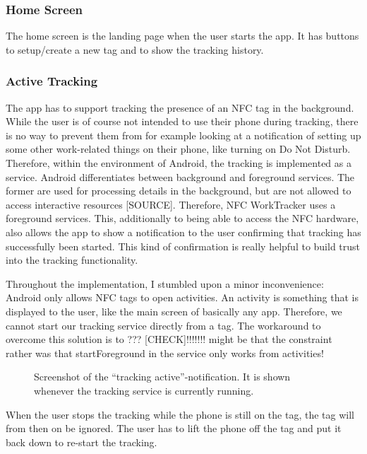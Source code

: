 \documentclass[conference]{IEEEtran}
\newcommand{\projectname}{NFC WorkTracker}
\begin{document}
\subsubsection{Home Screen}
The home screen is the landing page when the user starts the app. It has buttons to setup/create a new tag and to show the tracking history.

\subsubsection{Active Tracking}
The app has to support tracking the presence of an NFC tag in the background. While the user is of course not intended to use their phone during tracking, there is no way to prevent them from for example looking at a notification of setting up some other work-related things on their phone, like turning on Do Not Disturb. Therefore, within the environment of Android, the tracking is implemented as a service. Android differentiates between background and foreground services. The former are used for processing details in the background, but are not allowed to access interactive resources [SOURCE]. Therefore, \projectname{} uses a foreground services. This, additionally to being able to access the NFC hardware, also allows the app to show a notification to the user confirming that tracking has successfully been started. This kind of confirmation is really helpful to build trust into the tracking functionality.

Throughout the implementation, I stumbled upon a minor inconvenience: Android only allows NFC tags to open activities. An activity is something that is displayed to the user, like the main screen of basically any app. Therefore, we cannot start our tracking service directly from a tag. The workaround to overcome this solution is to ??? [CHECK]!!!!!!! might be that the constraint rather was that startForeground in the service only works from activities!


\begin{figure}
	\centering
	\caption{Screenshot of the ``tracking active''-notification. It is shown whenever the tracking service is currently running.}
	\label{fig:notification}
\end{figure}

When the user stops the tracking while the phone is still on the tag, the tag will from then on be ignored. The user has to lift the phone off the tag and put it back down to re-start the tracking.
\end{document}
